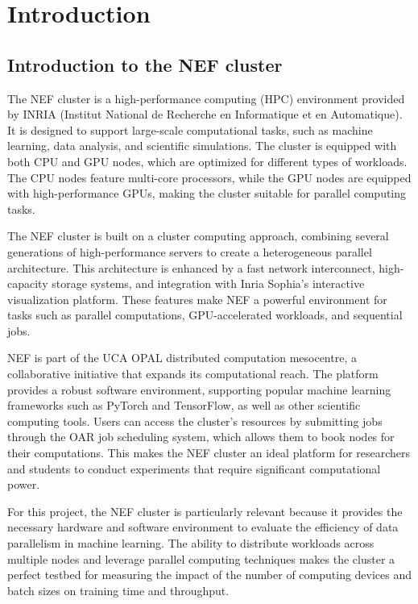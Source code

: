\documentclass{article}
\begin{document}

\thispagestyle{empty}
\newpage

\section{Introduction}
\subsection{Introduction to the NEF cluster}
The NEF cluster is a high-performance computing (HPC) environment provided by INRIA (Institut National de Recherche en Informatique et en Automatique). It is designed to support large-scale computational tasks, such as machine learning, data analysis, and scientific simulations. The cluster is equipped with both CPU and GPU nodes, which are optimized for different types of workloads. The CPU nodes feature multi-core processors, while the GPU nodes are equipped with high-performance GPUs, making the cluster suitable for parallel computing tasks.

The NEF cluster is built on a cluster computing approach, combining several generations of high-performance servers to create a heterogeneous parallel architecture. This architecture is enhanced by a fast network interconnect, high-capacity storage systems, and integration with Inria Sophia's interactive visualization platform. These features make NEF a powerful environment for tasks such as parallel computations, GPU-accelerated workloads, and sequential jobs.

NEF is part of the UCA OPAL distributed computation mesocentre, a collaborative initiative that expands its computational reach. The platform provides a robust software environment, supporting popular machine learning frameworks such as PyTorch and TensorFlow, as well as other scientific computing tools. Users can access the cluster's resources by submitting jobs through the OAR job scheduling system, which allows them to book nodes for their computations. This makes the NEF cluster an ideal platform for researchers and students to conduct experiments that require significant computational power.

For this project, the NEF cluster is particularly relevant because it provides the necessary hardware and software environment to evaluate the efficiency of data parallelism in machine learning. The ability to distribute workloads across multiple nodes and leverage parallel computing techniques makes the cluster a perfect testbed for measuring the impact of the number of computing devices and batch sizes on training time and throughput.
\end{document}
